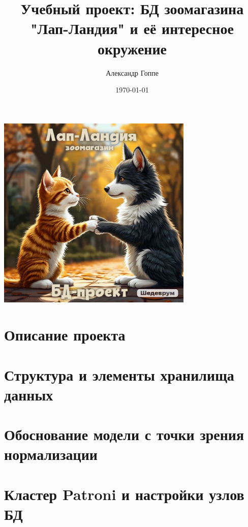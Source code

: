 \documentclass[a4paper,12pt]{article}
\title{Учебный проект: БД зоомагазина "Лап-Ландия" и её интересное окружение}
\author{Александр Гоппе}
\date{}
\begin{document}
    \maketitle

    \begin{center}
        \includegraphics[width=0.7\textwidth]{title} %
    \end{center}

    \vfill
    \begin{center}
        \date{\today}
    \end{center}
    \newpage

    \tableofcontents
    \newpage

    \section{Описание проекта}\label{sec:-projectdesc-}
    

    \section{Структура и элементы хранилища данных}\label{sec:-dbstructure-}
    

    \section{Обоснование модели с точки зрения нормализации}\label{sec:-normalization-}
    

    \section{Кластер Patroni и настройки узлов БД}\label{sec:-patronicluster-}
    
\end{document}
